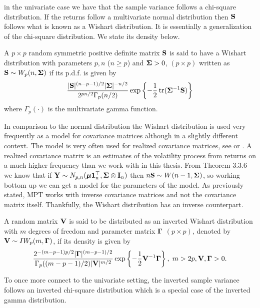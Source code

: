 \documentclass[oneside]{book}\usepackage{knitr}
\begin{document}
in the univariate case we have that the sample variance follows a chi-square distribution. If the returns follow a multivariate normal distribution then $\mathbf{S}$ follows what is known as a Wishart distribution. It is essentially a generalization of the chi-square distribution. We state its density below.
\begin{definition}
	A $p\times p$ random symmetric positive definite matrix $\mathbf{S}$ is said to have a Wishart distribution with parameters $p, n$ ($n\geq p$) and $\mathbf{\Sigma} > 0$, $(p \times p)$ written as $\mathbf{S} \sim W_p(n, \mathbf{\Sigma})$ if its p.d.f. is given by
	\begin{equation}\label{eqn:wishart_density}
  	\frac{|\mathbf{S}|^{(n-p-1)/2} |\mathbf{\Sigma}|^{- n/2} }{2^{pn/2} \Gamma_p (n/2) } \exp\left\{-\frac{1}{2} \operatorname{tr}(\mathbf{\Sigma}^{-1}\mathbf{S})  \right\}
	\end{equation}
	where $ \Gamma_p (\cdot) $ is the multivariate gamma function.
\end{definition}
In comparison to the normal distribution the Wishart distribution is used very frequently as a model for covariance matrices although in a slightly different context.
The model is very often used for realized covariance matrices, see \cite{barndorff2004econometric} or \citet{alfelt2021modeling}.
A realized covariance matrix is an estimates of the volatility process from returns on a much higher frequency than we work with in this thesis.
From Theorem 3.3.6 we know that if $\mathbf{Y} \sim N_{p,n}(\mbox{\boldmath$\mu$} \mathbf{1}_n^\top, \mathbf{\Sigma} \otimes \mathbf{I}_n)$ then $n\mathbf{S} \sim W(n-1, \mathbf{\Sigma})$, so working bottom up we can get a model for the parameters of the model.
As previously stated, MPT works with inverse covariance matrices and not the covariance matrix itself. Thankfully, the Wishart distribution has an inverse counterpart.
\begin{definition}
	A random matrix $\mathbf{V}$ is said to be distributed as an inverted Wishart distribution with $m$ degrees of freedom and parameter matrix $\boldsymbol{\Gamma}$ $(p \times p)$, denoted by $\mathbf{V} \sim IW_p(m, \boldsymbol{\Gamma})$, if its density is given by
	\begin{equation}\label{eqn:inverse_wishart}
	\frac{2^{-(m-p-1)p/2} |\boldsymbol{\Gamma}|^{(m-p-1)/2} }{\Gamma_p ((m-p-1)/2) |\mathbf{V}|^{m/2}} \exp\left\{ -\frac{1}{2} \mathbf{V}^{-1} \boldsymbol{\Gamma} \right\}, \; m > 2p, \mathbf{V}, \boldsymbol{\Gamma} > 0.
	\end{equation}
\end{definition}
To once more connect to the univariate setting, the inverted sample variance follows an inverted chi-square distribution which is a special case of the inverted gamma distribution.
\end{document}

